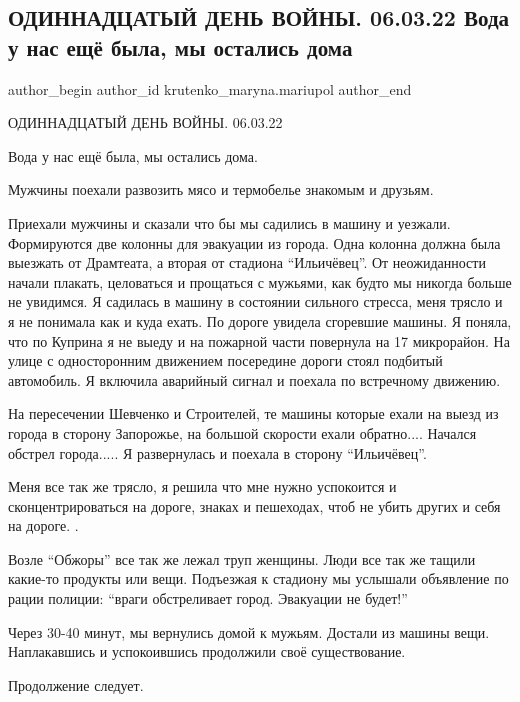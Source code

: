  
 
 
 
 

\subsection{ОДИННАДЦАТЫЙ ДЕНЬ ВОЙНЫ. 06.03.22 Вода у нас ещё была, мы остались дома}
\label{sec:06_03_2023.fb.krutenko_maryna.mariupol.1.11_den_06_03_voda_esche_byla_my_ostalis_doma}

\ifcmt
 author_begin
   author_id krutenko_maryna.mariupol
 author_end
\fi

ОДИННАДЦАТЫЙ ДЕНЬ ВОЙНЫ. 06.03.22

Вода у нас ещё была, мы остались дома. 

Мужчины поехали развозить мясо и термобелье знакомым и друзьям. 

Приехали мужчины и сказали что бы мы садились в машину и уезжали. Формируются
две колонны для эвакуации из города. Одна колонна должна была выезжать от
Драмтеата, а вторая от стадиона \enquote{Ильичёвец}. От неожиданности начали плакать,
целоваться и прощаться с мужьями, как будто мы никогда больше не увидимся. Я
садилась в машину в состоянии сильного стресса, меня трясло и я не понимала как
и куда ехать. По дороге увидела сгоревшие машины. Я поняла, что по Куприна я не
выеду и на пожарной части повернула на 17 микрорайон.  На улице с односторонним
движением посередине дороги стоял подбитый автомобиль. Я включила аварийный
сигнал и поехала по встречному движению. 

На пересечении Шевченко и Строителей, те машины которые ехали на выезд из
города в сторону Запорожье, на большой скорости ехали обратно.... Начался обстрел
города..... Я развернулась и поехала в сторону \enquote{Ильичёвец}. 

Меня все так же трясло, я решила что мне нужно успокоится и сконцентрироваться
на дороге, знаках и пешеходах, чтоб не убить других и себя на дороге.  . 

Возле \enquote{Обжоры} все так же лежал труп женщины. Люди все так же тащили какие-то
продукты или вещи. Подъезжая к стадиону мы услышали объявление по рации
полиции: \enquote{враги обстреливает город. Эвакуации не будет!} 

Через 30-40 минут, мы вернулись домой к мужьям. Достали из машины вещи.
Наплакавшись и успокоившись продолжили своё существование. 

Продолжение следует.

